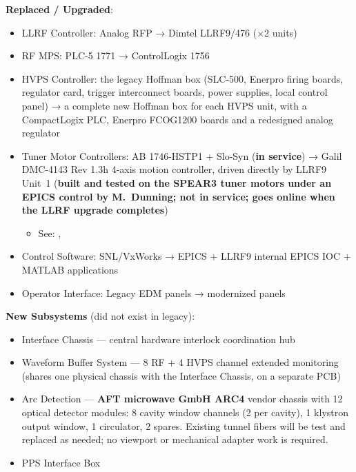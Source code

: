 {\noindent\textbf{Replaced / Upgraded}:

\begin{itemize}
\tightlist
\item
  LLRF Controller: Analog RFP → Dimtel LLRF9/476 (×2 units)
\item
  RF MPS: PLC-5 1771 → ControlLogix 1756
\item
  HVPS Controller: the legacy Hoffman box (SLC-500, Enerpro firing boards, regulator card, trigger interconnect boards, power supplies, local control panel) → a complete new Hoffman box for each HVPS unit, with a CompactLogix PLC, Enerpro FCOG1200 boards and a redesigned analog regulator
\item
  Tuner Motor Controllers: AB 1746-HSTP1 + Slo-Syn (\textbf{in service}) → Galil DMC-4143 Rev 1.3h 4-axis motion controller, driven directly by LLRF9 Unit~1 (\textbf{built and tested on the SPEAR3 tuner motors under an EPICS control by M.~Dunning; not in service; goes online when the LLRF upgrade completes})

  \begin{itemize}
  \tightlist
  \item
    See: , 
  \end{itemize}
\item
  Control Software: SNL/VxWorks → EPICS + LLRF9 internal EPICS IOC + MATLAB applications
\item
  Operator Interface: Legacy EDM panels → modernized panels
\end{itemize}

\noindent\textbf{New Subsystems} (did not exist in legacy):

\begin{itemize}
\tightlist
\item
  Interface Chassis --- central hardware interlock coordination hub
\item
  Waveform Buffer System --- 8 RF + 4 HVPS channel extended monitoring (shares one physical chassis with the Interface Chassis, on a separate PCB)
\item
  Arc Detection --- \textbf{AFT microwave GmbH ARC4} vendor chassis with 12 optical detector modules: 8 cavity window channels (2 per cavity), 1 klystron output window, 1 circulator, 2 spares. Existing tunnel fibers will be test and replaced as needed; no viewport or mechanical adapter work is required.
\item
  PPS Interface Box
\end{itemize}

}
